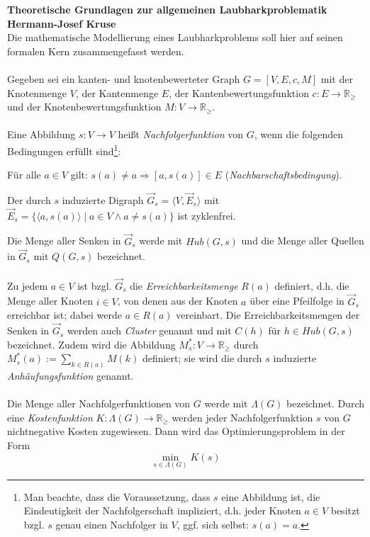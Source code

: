 \documentclass[fontsize=12pt,doubleside,openany,listof=totoc,listof=flat,listof=nochaptergap,numbers=noenddot]{article}
\author{Hermann-Josef Kruse}
\begin{document}
\textbf{Theoretische Grundlagen zur allgemeinen Laubharkproblematik}\\
\textbf{Hermann-Josef Kruse}\\

\noindent Die mathematische Modellierung eines Laubharkproblems soll hier auf seinen formalen Kern zusammengefasst werden.
\\ \\
Gegeben sei ein kanten- und knotenbewerteter Graph $G= [V,E,c,M]$ mit der Knotenmenge $V$, der Kantenmenge $E$, der Kantenbewertungsfunktion $c:E \to \mathbb{R}_\geq$ und der Knotenbewertungsfunktion $M:V \to \mathbb{R}_\geq$. \\
\\
Eine Abbildung $s:V \to V$ heißt \textit{Nachfolgerfunktion} von $G$, wenn die folgenden Bedingungen erfüllt sind\footnote{Man beachte, dass die Voraussetzung, dass $s$ eine Abbildung ist, die Eindeutigkeit der Nachfolgerschaft impliziert, d.h. jeder Knoten $a \in V$ besitzt bzgl. $s$ genau einen Nachfolger in $V$, ggf. sich selbst: $s(a)=a$.}:
\begin{compactenum}[(1)]
\item Für alle $a \in V$ gilt: $s(a) \neq a \Rightarrow [a,s(a)] \in E$ (\glqq \textit{Nachbarschaftsbedingung}\grqq{}). 
\item Der durch $s$ induzierte Digraph $\vec{G}_s=\langle V, \vec{E}_s \rangle$ mit $\vec{E}_s=\{\langle a,s(a)\rangle \mid a \in V \wedge a \neq s(a)\}$ ist zyklenfrei. \\
\end{compactenum}
Die Menge aller Senken in $\vec{G}_s$ werde mit $Hub(G,s)$ und die Menge aller Quellen in $\vec{G}_s$ mit $Q(G,s)$ bezeichnet.\\
\\
Zu jedem $a \in V$ ist bzgl. $\vec{G}_s$ die \textit{Erreichbarkeitsmenge}\label{Erreichbarkeitsmenge_2} $R(a)$ definiert, d.h. die Menge aller Knoten $i \in V$, von denen aus der Knoten $a$ über eine Pfeilfolge in $\vec{G}_s$ erreichbar ist; dabei werde $a \in R(a)$ vereinbart. Die Erreichbarkeitsmengen der Senken in $\vec{G}_s$ werden auch \textit{Cluster}\label{Cluster} genannt und mit $C(h)$ für $h \in Hub(G,s)$ bezeichnet. Zudem wird die Abbildung $M^*_s:V \to \mathbb{R}_\geq$ durch $M^*_s(a) := \sum\limits_{k \in R(a)}M(k)$ definiert; sie wird die durch $s$ induzierte \textit{Anhäufungsfunktion}\label{Anhäufungsfunktion_2} genannt. \\
\\
Die Menge aller Nachfolgerfunktionen von $G$ werde mit $\Lambda(G)$\label{Lambda} bezeichnet. Durch eine \textit{Kostenfunktion}\label{Kostenfunktion} $K:\Lambda(G) \to \mathbb{R}_\geq$ werden jeder Nachfolgerfunktion $s$ von $G$ nichtnegative Kosten zugewiesen. Dann wird das Optimierungsproblem in der Form 
\begin{equation*}
\min\limits_{s \in \Lambda(G)} K(s)
\label{definition_Laubharkproblem}
\end{equation*} 
\end{document}
